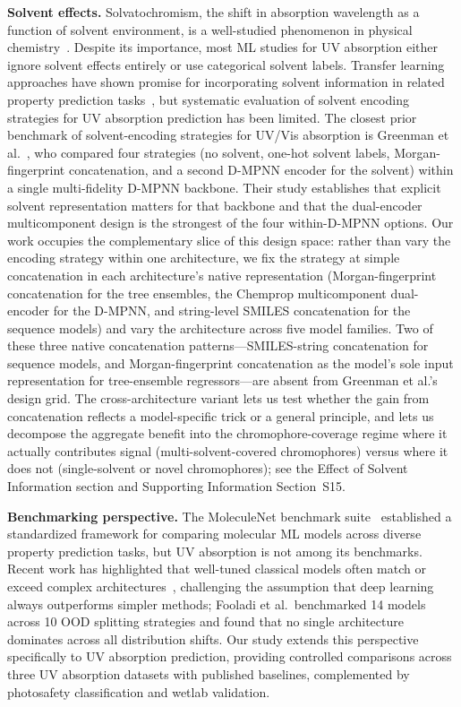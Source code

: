\documentclass[journal=jcisd8,manuscript=article]{achemso}
\newcommand{\added}[1]{{\color{addedblue}#1}}
\newcommand{\removed}[1]{{\color{removedred}#1}}
\begin{document}
\textbf{Solvent effects.}
Solvatochromism, the shift in absorption wavelength as a function of solvent environment, is a well-studied phenomenon in physical chemistry~\cite{reichardt2011solvents}.
Despite its importance, most ML studies for UV absorption either ignore solvent effects entirely or use categorical solvent labels.
Transfer learning approaches have shown promise for incorporating solvent information in related property prediction tasks~\cite{vermeire2021transfer}\removed{, but systematic evaluation of solvent encoding strategies for UV absorption prediction has been limited}.\added{ The closest prior benchmark of solvent-encoding strategies for UV/Vis absorption is Greenman et al.~\cite{greenman2022multifidelity}, who compared four strategies (no solvent, one-hot solvent labels, Morgan-fingerprint concatenation, and a second D-MPNN encoder for the solvent) within a single multi-fidelity D-MPNN backbone. Their study establishes that explicit solvent representation matters for that backbone and that the dual-encoder multicomponent design is the strongest of the four within-D-MPNN options. Our work occupies the complementary slice of this design space: rather than vary the encoding strategy within one architecture, we fix the strategy at simple concatenation in each architecture's native representation (Morgan-fingerprint concatenation for the tree ensembles, the Chemprop multicomponent dual-encoder for the D-MPNN, and string-level SMILES concatenation for the sequence models) and vary the architecture across five model families. Two of these three native concatenation patterns---SMILES-string concatenation for sequence models, and Morgan-fingerprint concatenation as the model's sole input representation for tree-ensemble regressors---are absent from Greenman et al.'s design grid. The cross-architecture variant lets us test whether the gain from concatenation reflects a model-specific trick or a general principle, and lets us decompose the aggregate benefit into the chromophore-coverage regime where it actually contributes signal (multi-solvent-covered chromophores) versus where it does not (single-solvent or novel chromophores); see the Effect of Solvent Information section and Supporting Information Section~S15.}

\textbf{Benchmarking perspective.}
The MoleculeNet benchmark suite~\cite{wuMoleculeNet2018} established a standardized framework for comparing molecular ML models across diverse property prediction tasks, but UV absorption is not among its benchmarks.
Recent work has highlighted that well-tuned classical models often match or exceed complex architectures~\cite{panapitiya2022evaluation, walters2021applications, fooladi2025evaluating}, challenging the assumption that deep learning always outperforms simpler methods; Fooladi et al.\ benchmarked 14 models across 10 OOD splitting strategies and found that no single architecture dominates across all distribution shifts.
Our study extends this perspective specifically to UV absorption prediction, providing controlled comparisons across three UV absorption datasets with published baselines, complemented by photosafety classification and wetlab validation.
\end{document}

